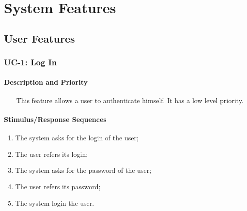 \documentclass{report}
\begin{document}
\chapter{System Features}

\section{User Features}

\subsection{UC-1: Log In}

\subsubsection*{Description and Priority} ~~~
This feature allows a user to authenticate himself.
It has a low level priority.


\subsubsection*{Stimulus/Response Sequences}
\begin{enumerate}
	\item The system asks for the login of the user;
	\item The user refers its login;
	\item The system asks for the password of the user;
	\item The user refers its password;
	\item The system login the user.
\end{enumerate}

\end{document}
